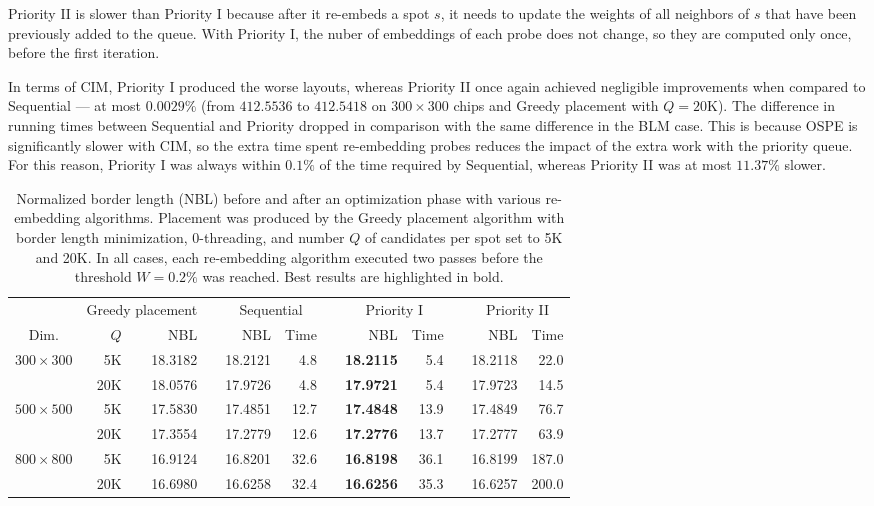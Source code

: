 Priority II is slower than Priority I because after it re-embeds a spot $s$, it
needs to update the weights of all neighbors of $s$ that have been previously
added to the queue. With Priority I, the nuber of embeddings of each probe does
not change, so they are computed only once, before the first iteration.

In terms of CIM, Priority I produced the worse layouts, whereas Priority II once
again achieved negligible improvements when compared to Sequential --- at most
$0.0029\%$ (from $412.5536$ to $412.5418$ on $300\times 300$ chips and Greedy
placement with $Q=20$K). The difference in running times between Sequential and
Priority dropped in comparison with the same difference in the BLM case. This is
because OSPE is significantly slower with CIM, so the extra time spent
re-embedding probes reduces the impact of the extra work with the priority
queue. For this reason, Priority I was always within $0.1\%$ of the time
required by Sequential, whereas Priority II was at most $11.37\%$ slower.

\begin{table}[t]\centering
\caption{\label{tab:priority_bl}
  Normalized border length (NBL) before and after an optimization phase with
  various re-embedding algorithms. Placement was produced by the Greedy
  placement algorithm with border length minimization, $0$-threading, and number
  $Q$ of candidates per spot set to 5K and 20K. In all cases, each re-embedding
  algorithm executed two passes before the threshold $W=0.2\%$ was reached. Best
  results are highlighted in bold.}
\footnotesize{
\begin{tabular}{crrlrrlrrlrr}
\vspace{1pt}
     & \multicolumn{2}{c}{Greedy placement} & & \multicolumn{2}{c}{Sequential} & & \multicolumn{2}{c}{Priority I} & & \multicolumn{2}{c}{Priority II} \\ \cline{2-3} \cline{5-6} \cline{8-9} \cline{11-12}
\vspace{1pt}
Dim. & $Q$ & NBL & & NBL & Time & & NBL & Time & & NBL & Time \\
\hline
$300\times 300$ &  5K & 18.3182 &  & 18.2121 &  4.8 &  & {\bf 18.2115} &  5.4 &  & 18.2118 &  22.0 \\
                & 20K & 18.0576 &  & 17.9726 &  4.8 &  & {\bf 17.9721} &  5.4 &  & 17.9723 &  14.5 \\
\hline
$500\times 500$ &  5K & 17.5830 &  & 17.4851 & 12.7 &  & {\bf 17.4848} & 13.9 &  & 17.4849 &  76.7 \\
                & 20K & 17.3554 &  & 17.2779 & 12.6 &  & {\bf 17.2776} & 13.7 &  & 17.2777 &  63.9 \\
\hline
$800\times 800$ &  5K & 16.9124 &  & 16.8201 & 32.6 &  & {\bf 16.8198} & 36.1 &  & 16.8199 & 187.0 \\
                & 20K & 16.6980 &  & 16.6258 & 32.4 &  & {\bf 16.6256} & 35.3 &  & 16.6257 & 200.0 \\
\hline
\end{tabular}}
\end{table}


